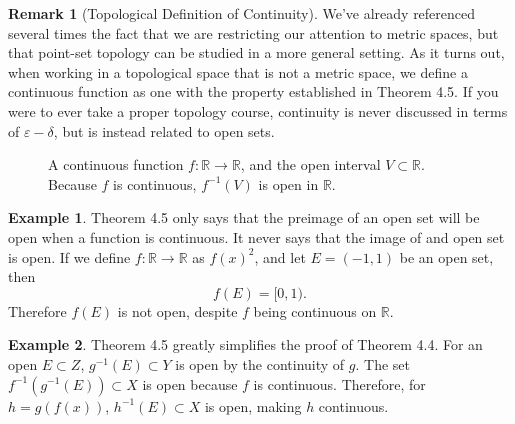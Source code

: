 \documentclass{article}
\newcommand{\R}{\mathbb{R}}
\theoremstyle{definition}
\newtheorem{example}{Example}[section]
\newtheorem{remark}{Remark}[section]
\begin{document}
	\begin{remark}[Topological Definition of Continuity]
		We've already referenced several times the fact that we are restricting our attention to metric spaces, but that point-set topology can be studied in a more general setting. As it turns out, when working in a topological space that is not a metric space, we define a continuous function as one with the property established in Theorem 4.5. If you were to ever take a proper topology course, continuity is never discussed in terms of $ \varepsilon-\delta $, but is instead related to open sets.
	\end{remark}
	\begin{figure}[h!]
		\centering
		\caption{A continuous function $ f:\R\to\R $, and the open interval $ V\subset \R $. Because $ f $ is continuous, $ f^{-1}(V) $ is open in $ \R $. }
	\end{figure}
	\begin{example}
		Theorem 4.5 only says that the preimage of an open set will be open when a function is continuous. It never says that the image of and open set is open. If we define $ f:\R\to\R $ as $ f(x)^2 $, and let $ E=(-1,1) $ be an open set, then $$f(E)=[0,1) .$$ Therefore $ f(E) $ is not open, despite $ f $ being continuous on $ \R $. 
	\end{example}
	\begin{example}
		Theorem 4.5 greatly simplifies the proof of Theorem 4.4. For an open $ E\subset Z $, $ g^{-1}(E)\subset Y $ is open by the continuity of $ g $. The set $ f^{-1}(g^{-1}(E))\subset X $ is open because $ f $ is continuous. Therefore, for $ h=g(f(x)) $, $ h^{-1}(E)\subset X $ is open, making $ h $ continuous. 
	\end{example}
\end{document}
